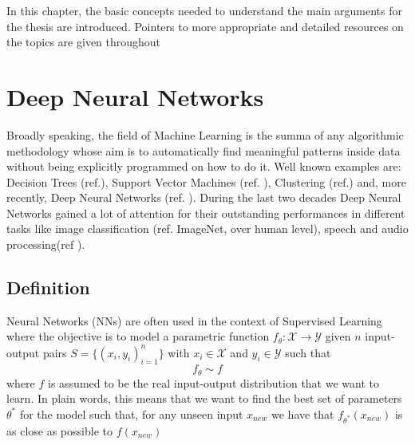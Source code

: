 \documentclass[LaM,binding=0.6cm]{./packages/sapthesis/sapthesis}
\begin{document}
    In this chapter, the basic concepts needed to understand the main arguments for the thesis are introduced. Pointers to more appropriate and detailed resources on the topics are given throughout

    \section{Deep Neural Networks}
        
        Broadly speaking, the field of Machine Learning is the summa of any algorithmic methodology whose aim is to automatically find meaningful patterns inside data without
        being explicitly programmed on how to do it. Well known examples are: Decision Trees (ref.), Support Vector Machines (ref. ), Clustering (ref.) and, more recently, 
        Deep Neural Networks (ref. ). During the last two decades Deep Neural Networks gained a lot of attention for their outstanding performances in different tasks like
        image classification (ref. ImageNet, over human level), speech and audio processing(ref ).

        \subsection{Definition}
            
            Neural Networks (NNs) are often used in the context of Supervised Learning where the objective is to model a parametric function 
            $ f_{\theta} \colon \mathcal{X} \to \mathcal{Y}$ given $n$ input-output pairs $S = \{(x_i, y_i)_{i=1}^n\} $ with $x_i \in \mathcal{X}$ and $ y_i \in \mathcal{Y}$
            such that
            \begin{equation}
                f_{\theta} \sim f  
            \end{equation}
            where $f$ is assumed to be the real input-output distribution that we want to learn. In plain words, this means that we want to find the best set of parameters $\theta^{*}$ for the model
            such that, for any unseen input $x_{new}$ we have that $f_{\theta^*}\left(x_{new}\right)$ is as close as possible to $f\left(x_{new}\right)$
\end{document}
